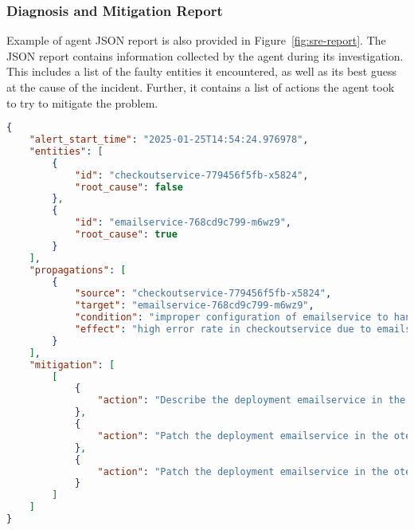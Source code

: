 
\subsubsection{Diagnosis and Mitigation Report}
Example of agent JSON report is also provided in Figure~\ref{fig:sre-report}. The JSON report contains information collected by the agent during its investigation. This includes a list of the faulty entities it encountered, as well as its best guess at the cause of the incident. Further, it contains a list of actions the agent took to try to mitigate the problem.


\begin{figure*}

    \centering
     \begin{mdframed}
\scriptsize
\begin{lstlisting}[language=JSON]
{
    "alert_start_time": "2025-01-25T14:54:24.976978",
    "entities": [
        {
            "id": "checkoutservice-779456f5fb-x5824",
            "root_cause": false
        },
        {
            "id": "emailservice-768cd9c799-m6wz9",
            "root_cause": true
        }
    ],
    "propagations": [
        {
            "source": "checkoutservice-779456f5fb-x5824",
            "target": "emailservice-768cd9c799-m6wz9",
            "condition": "improper configuration of emailservice to handle volume of requests from checkoutservice",
            "effect": "high error rate in checkoutservice due to emailservice not properly handling requests"
        }
    ],
    "mitigation": [
        [
            {
                "action": "Describe the deployment emailservice in the otel-demo namespace to understand its current configuration"
            },
            {
                "action": "Patch the deployment emailservice in the otel-demo namespace to increase the memory limit of the container emailservice to 200Mi"
            },
            {
                "action": "Patch the deployment emailservice in the otel-demo namespace to increase the number of replicas to 2"
            }
        ]
    ]
}
\end{lstlisting}
\end{mdframed}
\caption{Example agent output for Scenario 15.}
\label{fig:sre-report}
\end{figure*}
